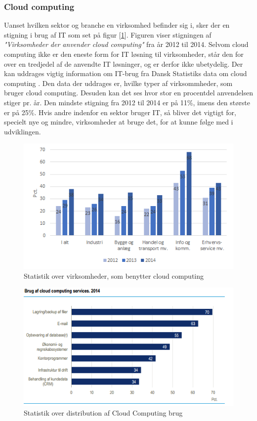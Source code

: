 \newpage
\subsubsection{Cloud computing}
Uanset hvilken sektor og branche en virksomhed befinder sig i, sker der en stigning i brug af IT som set på figur [\ref{fig:virksomcc}]. Figuren viser stigningen af \textit{"Virksomheder der anvender cloud computing"} fra år 2012 til 2014. Selvom cloud computing ikke er den eneste form for IT løsning til virksomheder, står den for over en tredjedel af de anvendte IT løsninger, og er derfor ikke ubetydelig. Der kan uddrages vigtig information om IT-brug fra Dansk Statistiks data om cloud computing \citep{itvirk}. Den data der uddrages er, hvilke typer af virksommheder, som bruger cloud computing. Desuden kan det ses hvor stor en procentdel anvendelsen stiger pr. år. Den mindste stigning fra 2012 til 2014 er på 11\%, imens den største er på 25\%. Hvis andre indenfor en sektor bruger IT, så bliver det vigtigt for, specielt nye og mindre, virksomheder  at bruge det, for at kunne følge med i udviklingen.  
\newpage
\begin{figure}[H]
    \centering
    \includegraphics[width=1\textwidth]{figures/CloudComputingStatestik.png}
    \caption{Statistik over virksomheder, som benytter cloud computing \citep{itvirk}} 
    \label{fig:virksomcc}
\end{figure}

\begin{figure}[H]
    \centering
    \includegraphics[width=1\textwidth]{figures/brugafccservices.png}
    \caption{Statistik over distribution af Cloud Computing brug \citep{itvirk}}
    \label{fig:distcc}
\end{figure}


